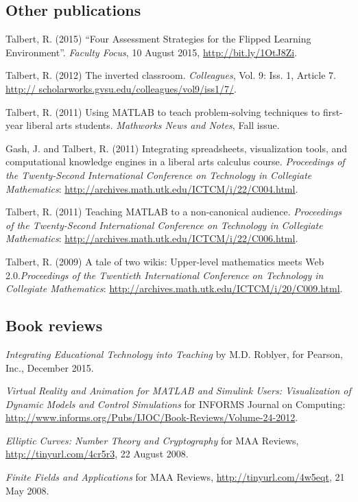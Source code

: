 \documentclass[letterpaper]{article}
\renewenvironment{itemize}{
  \begin{list}{}{
    \setlength{\leftmargin}{1.5em}
	\setlength{\itemsep}{0in}
  }
}{
  \end{list}
}
\begin{document}
\subsection*{Other publications}
\begin{itemize}
	\item Talbert, R. (2015) ``Four Assessment Strategies for the Flipped Learning Environment''. \textit{Faculty Focus}, 10 August 2015, \url{http://bit.ly/1OtJ8Zi}. 
	\item Talbert, R. (2012) The inverted classroom. \emph{Colleagues}, Vol. 9: Iss. 1, Article 7. \url{http:// scholarworks.gvsu.edu/colleagues/vol9/iss1/7/}.  
	\item Talbert, R. (2011) Using MATLAB to teach problem-solving techniques to first-year liberal arts students.\emph{ Mathworks News and Notes}, Fall issue.
	\item Gash, J. and Talbert, R. (2011) Integrating spreadsheets, visualization tools, and computational knowledge engines in a liberal arts calculus course. \emph{Proceedings of the Twenty-Second International Conference on Technology in Collegiate Mathematics}: \url{http://archives.math.utk.edu/ICTCM/i/22/C004.html}. 
	\item Talbert, R. (2011) Teaching MATLAB to a non-canonical audience. \emph{Proceedings of the Twenty-Second International Conference on Technology in Collegiate Mathematics}: \url{http://archives.math.utk.edu/ICTCM/i/22/C006.html}. 
	\item Talbert, R. (2009) A tale of two wikis: Upper-level mathematics meets Web 2.0.\emph{Proceedings of the Twentieth International Conference on Technology in Collegiate Mathematics}: \url{http://archives.math.utk.edu/ICTCM/i/20/C009.html}.
\end{itemize}

\subsection*{Book reviews}
\begin{itemize}
	\item \emph{Integrating Educational Technology into Teaching} by M.D. Roblyer, for Pearson, Inc., December 2015. 
	\item \emph{Virtual Reality and Animation for MATLAB and Simulink Users: Visualization of Dynamic Models and Control Simulations} for INFORMS Journal on Computing: \url{http://www.informs.org/Pubs/IJOC/Book-Reviews/Volume-24-2012}. 
	\item \emph{Elliptic Curves: Number Theory and Cryptography} for MAA Reviews, \url{http://tinyurl.com/4cr5r3}, 22 August 2008.
	\item \emph{Finite Fields and Applications} for MAA Reviews, \url{http://tinyurl.com/4w5eqt}, 21 May 2008.
\end{itemize}
\end{document}

